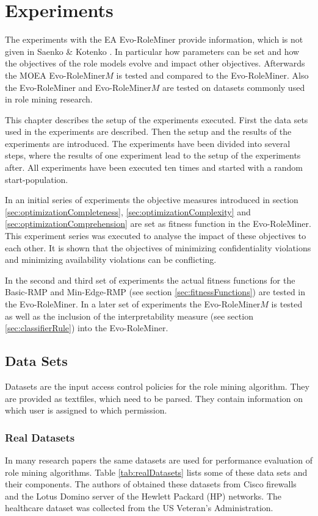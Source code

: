 \newpage
\chapter{Experiments}
\label{sec:experiments}
The experiments with the EA Evo-RoleMiner provide information, which is not given in Saenko \& Kotenko \cite{saenko2012design}. In particular how parameters can be set and how the objectives of the role models evolve and impact other objectives. Afterwards the MOEA Evo-RoleMiner$M$ is tested and compared to the Evo-RoleMiner. Also the Evo-RoleMiner and Evo-RoleMiner$M$ are tested on datasets commonly used in role mining research.

This chapter describes the setup of the experiments executed. First the data sets used in the experiments are described. Then the setup and the results of the experiments are introduced. The experiments have been divided into several steps, where the results of one experiment lead to the setup of the experiments after. All experiments have been executed ten times and started with a random start-population.

In an initial series of experiments the objective measures introduced in section \ref{sec:optimizationCompleteness}, \ref{sec:optimizationComplexity} and \ref{sec:optimizationComprehension} are set as fitness function in the Evo-RoleMiner. This experiment series was executed to analyse the impact of these objectives to each other. It is shown that the objectives of minimizing confidentiality violations and minimizing availability violations can be conflicting.

In the second and third set of experiments the actual fitness functions for the Basic-RMP and Min-Edge-RMP (see section \ref{sec:fitnessFunctions}) are tested in the Evo-RoleMiner. In a later set of experiments the Evo-RoleMiner$M$ is tested as well as the inclusion of the interpretability measure (see section \ref{sec:classifierRule}) into the Evo-RoleMiner.

\section{Data Sets}
Datasets are the input access control policies for the role mining algorithm. They are provided as textfiles, which need to be parsed. They contain information on which user is assigned to which permission.
\subsection{Real Datasets}
In many research papers the same datasets are used for performance evaluation of role mining algorithms. Table \ref{tab:realDatasets} lists some of these data sets and their components. The authors of \cite{Ene} obtained these datasets from Cisco firewalls and the Lotus Domino server of the Hewlett Packard (HP) networks. The healthcare dataset was collected from the US Veteran’s Administration.

